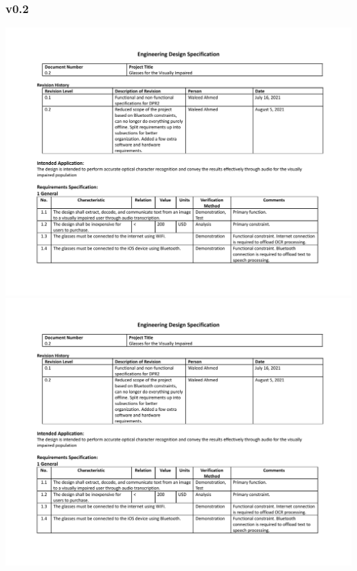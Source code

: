 \documentclass[a4paper,11pt]{article}
\begin{document}
\begin{landscape}
    \newpage
    \subsubsection{v0.2}
    \label{eds-0.2}
    \begin{center}
        \includegraphics[page=1,width={0.86\linewidth}]{pdf/eds_0.2.pdf}
        \newpage
        \includegraphics[page=2,width={0.86\linewidth}]{pdf/eds_0.2.pdf}
        \newpage

\end{center}
\end{landscape}
\end{document}
